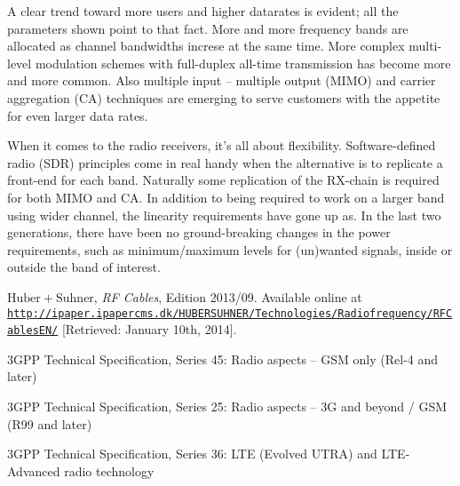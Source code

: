 \documentclass[a4paper, 12pt]{article}
\begin{document}
A clear trend toward more users and higher datarates is evident; all the 
parameters shown point to that fact. More and more frequency bands are 
allocated as channel bandwidths increse at the same time. More complex 
multi-level modulation schemes with full-duplex all-time transmission has 
become more and more common. Also multiple input -- multiple output (MIMO) 
and carrier aggregation (CA) techniques are emerging to serve customers 
with the appetite for even larger data rates.

When it comes to the radio receivers, it's all about flexibility. 
Software-defined radio (SDR) principles come in real handy when the alternative 
is to replicate a front-end for each band. Naturally some replication of the 
RX-chain is required for both MIMO and CA. In addition to being required 
to work on a larger band using wider channel, the linearity requirements 
have gone up as. In the last two generations, there have been no ground-breaking 
changes in the power requirements, such as minimum/maximum levels for 
(un)wanted signals, inside or outside the band of interest.

\newpage
\begin{thebibliography}{9}%

 $\mathrm{Huber}+\mathrm{Suhner}$, 
	\textit{RF Cables}, 
	Edition 2013/09. 
	Available online at \href{http://ipaper.ipapercms.dk/HUBERSUHNER/Technologies/Radiofrequency/RFCablesEN/}
		{\texttt{http://ipaper.\linebreak{}ipapercms.dk/HUBERSUHNER/Technologies/Radiofrequency/RFCablesEN/}}
	[Retrieved: January 10th, 2014].
	
 3GPP Technical Specification, Series 45: 
	Radio aspects -- GSM only (Rel-4 and later)
	
 3GPP Technical Specification, Series 25: 
	Radio aspects -- 3G and beyond / GSM (R99 and later)
	
 3GPP Technical Specification, Series 36: 
	LTE (Evolved UTRA) and LTE-Advanced radio technology

	

	
	

\end{thebibliography}
\end{document}
